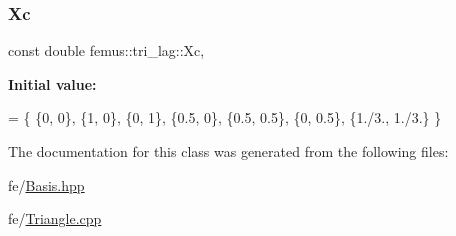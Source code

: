 \subsubsection{\texorpdfstring{Xc}{Xc}}
{\footnotesize\ttfamily const double femus\+::tri\+\_\+lag\+::\+Xc\hspace{0.3cm}{\ttfamily [static]}, {\ttfamily [protected]}}

{\bfseries Initial value\+:}
\begin{DoxyCode}
= \{
    \{0, 0\},         \{1, 0\},         \{0, 1\},
    \{0.5, 0\},       \{0.5, 0.5\},     \{0, 0.5\},  
    \{1./3., 1./3.\}
   \}
\end{DoxyCode}


The documentation for this class was generated from the following files\+:\begin{DoxyCompactItemize}
\item 
fe/\mbox{\hyperlink{_basis_8hpp}{Basis.\+hpp}}\item 
fe/\mbox{\hyperlink{_triangle_8cpp}{Triangle.\+cpp}}\end{DoxyCompactItemize}

